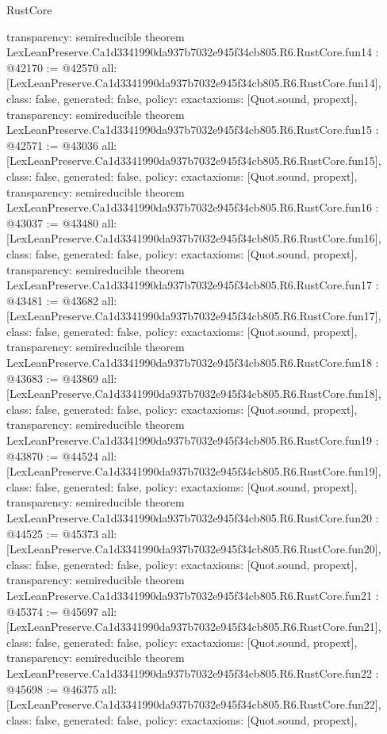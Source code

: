 \begin{lexlean}{RustCore}
\begin{coremodule}
{  transparency: semireducible
}
theorem LexLeanPreserve.Ca1d3341990da937b7032e945f34cb805.R6.RustCore.fun14 : @42170 := @42570 {
  all: [LexLeanPreserve.Ca1d3341990da937b7032e945f34cb805.R6.RustCore.fun14],
  class: false,
  generated: false,
  policy: exact{axioms: [Quot.sound, propext]},
  transparency: semireducible
}
theorem LexLeanPreserve.Ca1d3341990da937b7032e945f34cb805.R6.RustCore.fun15 : @42571 := @43036 {
  all: [LexLeanPreserve.Ca1d3341990da937b7032e945f34cb805.R6.RustCore.fun15],
  class: false,
  generated: false,
  policy: exact{axioms: [Quot.sound, propext]},
  transparency: semireducible
}
theorem LexLeanPreserve.Ca1d3341990da937b7032e945f34cb805.R6.RustCore.fun16 : @43037 := @43480 {
  all: [LexLeanPreserve.Ca1d3341990da937b7032e945f34cb805.R6.RustCore.fun16],
  class: false,
  generated: false,
  policy: exact{axioms: [Quot.sound, propext]},
  transparency: semireducible
}
theorem LexLeanPreserve.Ca1d3341990da937b7032e945f34cb805.R6.RustCore.fun17 : @43481 := @43682 {
  all: [LexLeanPreserve.Ca1d3341990da937b7032e945f34cb805.R6.RustCore.fun17],
  class: false,
  generated: false,
  policy: exact{axioms: [Quot.sound, propext]},
  transparency: semireducible
}
theorem LexLeanPreserve.Ca1d3341990da937b7032e945f34cb805.R6.RustCore.fun18 : @43683 := @43869 {
  all: [LexLeanPreserve.Ca1d3341990da937b7032e945f34cb805.R6.RustCore.fun18],
  class: false,
  generated: false,
  policy: exact{axioms: [Quot.sound, propext]},
  transparency: semireducible
}
theorem LexLeanPreserve.Ca1d3341990da937b7032e945f34cb805.R6.RustCore.fun19 : @43870 := @44524 {
  all: [LexLeanPreserve.Ca1d3341990da937b7032e945f34cb805.R6.RustCore.fun19],
  class: false,
  generated: false,
  policy: exact{axioms: [Quot.sound, propext]},
  transparency: semireducible
}
theorem LexLeanPreserve.Ca1d3341990da937b7032e945f34cb805.R6.RustCore.fun20 : @44525 := @45373 {
  all: [LexLeanPreserve.Ca1d3341990da937b7032e945f34cb805.R6.RustCore.fun20],
  class: false,
  generated: false,
  policy: exact{axioms: [Quot.sound, propext]},
  transparency: semireducible
}
theorem LexLeanPreserve.Ca1d3341990da937b7032e945f34cb805.R6.RustCore.fun21 : @45374 := @45697 {
  all: [LexLeanPreserve.Ca1d3341990da937b7032e945f34cb805.R6.RustCore.fun21],
  class: false,
  generated: false,
  policy: exact{axioms: [Quot.sound, propext]},
  transparency: semireducible
}
theorem LexLeanPreserve.Ca1d3341990da937b7032e945f34cb805.R6.RustCore.fun22 : @45698 := @46375 {
  all: [LexLeanPreserve.Ca1d3341990da937b7032e945f34cb805.R6.RustCore.fun22],
  class: false,
  generated: false,
  policy: exact{axioms: [Quot.sound, propext]},
}
\end{coremodule}
\end{lexlean}
